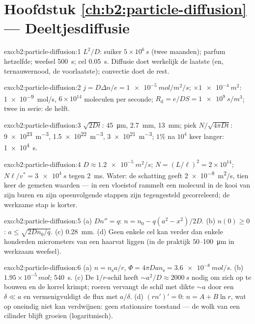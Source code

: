 \section*{Hoofdstuk \ref{ch:b2:particle-diffusion} --- Deeltjesdiffusie}

\begin{solution}{exo:b2:particle-diffusion:1}
$L^2/D$: suiker $5 \times 10^6\,\unit{s}$ (twee maanden); parfum hetzelfde;
weefsel \qty{500}{s}; cel \qty{0.05}{s}. Diffusie doet werkelijk de laatste
(en, ternauwernood, de voorlaatste); convectie doet de rest.
\end{solution}

\begin{solution}{exo:b2:particle-diffusion:2}
$j = D\Delta n/e = \qty{1e-5}{mol/m^2/s}$; $\times \qty{1e-4}{m^2}$:
\qty{1e-9}{mol/s}, $6 \times 10^{14}$ moleculen per seconde;
$R_{\text{d}} = e/DS = \qty{1e9}{s/m^3}$; twee in serie: de helft.
\end{solution}

\begin{solution}{exo:b2:particle-diffusion:3}
$\sqrt{2Dt}$: \qty{45}{\micro m}, \qty{2.7}{mm}, \qty{13}{mm}; piek
$N/\sqrt{4\pi
Dt}$: \qty{9e23}{m^{-3}}, \qty{1.5e22}{m^{-3}},
\qty{3e21}{m^{-3}}; $1\%$
na $10^4$ keer langer: \qty{1e4}{s}.
\end{solution}

\begin{solution}{exo:b2:particle-diffusion:4}
$D \approx \qty{1.2e-5}{m^2/s}$; $N = (L/\ell)^2 = 2 \times 10^{14}$;
$N\ell/v^*
= \qty{3e4}{s}$ tegen \qty{2}{ms}. Water: de schatting geeft
\qty{2e-8}{m^2/s}, tien keer de gemeten waarden --- in een vloeistof
rammelt een molecuul in de kooi van zijn buren en zijn opeenvolgende stappen
zijn tegengesteld gecorreleerd; de werkzame stap is korter.
\end{solution}

\begin{solution}{exo:b2:particle-diffusion:5}
(a) $Dn'' = q$: $n = n_0 - q(a^2 - x^2)/2D$. (b) $n(0) \ge 0$:
$a \le
\sqrt{2Dn_0/q}$. (c) \qty{0.28}{mm}. (d) Geen enkele cel kan verder
dan
enkele honderden micrometers van een haarvat liggen (in de praktijk
$50$--\qty{100}{\micro m}
in werkzaam weefsel).
\end{solution}

\begin{solution}{exo:b2:particle-diffusion:6}
(a) $n = n_{\text{s}}a/r$, $\Phi = 4\pi D a n_{\text{s}} = \qty{3.6e-8}{mol/s}$.
(b) $1.95 \times 10^{-5}\,\unit{mol}$; \qty{540}{s}. (c) De $1/r$-schil heeft
$\sim a^2/D \approx \qty{2000}{s}$ nodig om zich op te bouwen en de korrel
krimpt; roeren
vervangt de schil met dikte $\sim a$ door een  $\delta \ll a$
en vermenigvuldigt de flux met $a/\delta$. (d) $(rn')' = 0$: $n = A + B\ln r$,
wat op oneindig niet kan verdwijnen: geen stationaire toestand --- de wolk van een
cilinder blijft groeien (logaritmisch).
\end{solution}

